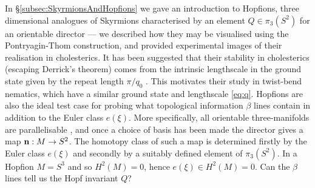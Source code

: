 {In \S\ref{subsec:SkyrmionsAndHopfions} we gave an introduction to Hopfions, three dimensional analogues of Skyrmions characterised by an element $Q\in \pi_3(S^2)$ for an orientable director --- we described how they may be visualised using the Pontryagin-Thom construction, and provided experimental images of their realisation in cholesterics. It has been suggested that their stability in cholesterics (escaping Derrick's theorem) comes from the intrinsic lengthscale in the ground state given by the repeat length $\pi/q_0$ \citep{Ackerman2017}. This motivates their study in twist-bend nematics, which have a similar ground state and lengthscale \eqref{eq:q}. Hopfions are also the ideal test case for probing what topological information $\beta$ lines contain in addition to the Euler class $e(\xi)$. More specifically, all orientable three-manifolds are parallelisable \citep{Geiges2009}, and once a choice of basis has been made the director gives a map $\mathbf{n} :M\rightarrow S^2$. The homotopy class of such a map is determined firstly by the Euler class $e(\xi)$ and secondly by a suitably defined element of $\pi_3(S^2)$. In a Hopfion $M=S^3$ and so $H^2(M)=0$, hence $e(\xi)\in H^2(M)=0$. Can the $\beta$ lines tell us the Hopf invariant $Q$?

}
